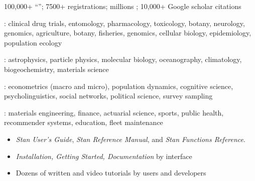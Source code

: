 \documentclass[10pt]{report}
\begin{document}
%
\begin{subitemize}
\item 100,000+ ``'';  7500+  registrations;  millions ; 10,000+ Google scholar citations
\item {}: {\footnotesize
clinical drug trials, entomology, pharmacology, toxicology, botany,
neurology, genomics, agriculture, botany, fisheries, genomics, cellular
biology, epidemiology, population ecology
}
\item {}: {\footnotesize
astrophysics, particle physics, molecular biology, oceanography, climatology, biogeochemistry, materials science
}
\item {}: {\footnotesize
 econometrics (macro and micro), population dynamics, cognitive
 science, psycholinguistics, social networks, political science,
 survey sampling
}
\item {}: {\footnotesize materials engineering, finance,
    actuarial science, sports, public health, recommender systems,
    education, fleet maintenance}
\end{subitemize}


%
\begin{itemize}
\item {\slshape Stan User's Guide}, {\slshape Stan Reference Manual}, and {\slshape Stan Functions Reference}.
\item {\slshape Installation, Getting Started, Documentation} by interface
\item Dozens of written and video tutorials by users and developers
\end{itemize}
\end{document}
